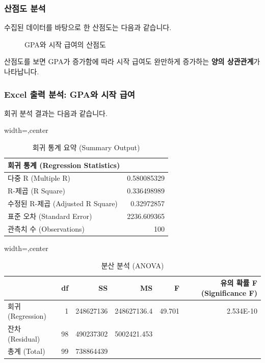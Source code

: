 \documentclass[11pt,a4paper]{book}
\theoremstyle{definition}
\begin{document}
\subsubsection{산점도 분석}
수집된 데이터를 바탕으로 한 산점도는 다음과 같습니다.
\begin{figure}[h!]
    \centering
    \caption{GPA와 시작 급여의 산점도}
    \label{fig:gpa_salary_scatter}
\end{figure}
\begin{tcolorbox}[colback=lightblue,colframe=darkblue,title={산점도 분석: GPA와 시작 급여}]
산점도를 보면 GPA가 증가함에 따라 시작 급여도 완만하게 증가하는 \textbf{양의 상관관계}가 나타납니다.
\end{tcolorbox}

\subsubsection{Excel 출력 분석: GPA와 시작 급여}
회귀 분석 결과는 다음과 같습니다.

\begin{table}[h!]
    \centering
    \caption{회귀 통계 요약 (Summary Output)}
    \label{tab:regression_summary_output_gpa}
    \begin{adjustbox}{width=\textwidth,center}
    \begin{tabular}{lr}
    \toprule
    \textbf{회귀 통계 (Regression Statistics)} & \\
    \midrule
    다중 R (Multiple R) & 0.580085329 \\
    R-제곱 (R Square) & 0.336498989 \\
    수정된 R-제곱 (Adjusted R Square) & 0.32972857 \\
    표준 오차 (Standard Error) & 2236.609365 \\
    관측치 수 (Observations) & 100 \\
    \bottomrule
    \end{tabular}
    \end{adjustbox}
\end{table}

\begin{table}[h!]
    \centering
    \caption{분산 분석 (ANOVA)}
    \label{tab:anova_gpa}
    \begin{adjustbox}{width=\textwidth,center}
    \begin{tabular}{lrrrrr}
    \toprule
    & \textbf{df} & \textbf{SS} & \textbf{MS} & \textbf{F} & \textbf{유의 확률 F (Significance F)} \\
    \midrule
    회귀 (Regression) & 1 & 248627136 & 248627136.4 & 49.701 & 2.534E-10 \\
    잔차 (Residual) & 98 & 490237302 & 5002421.453 & & \\
    총계 (Total) & 99 & 738864439 & & & \\
    \bottomrule
    \end{tabular}
    \end{adjustbox}
\end{table}
\end{document}
